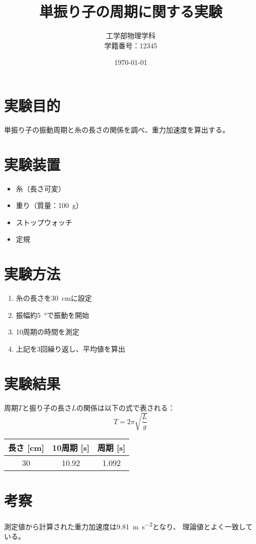 \documentclass[a4paper,11pt]{article}
\title{単振り子の周期に関する実験}
\author{工学部物理学科 \\ 学籍番号：12345}
\date{\today}
\begin{document}
\maketitle

\section{実験目的}
単振り子の振動周期と糸の長さの関係を調べ、重力加速度を算出する。

\section{実験装置}
\begin{itemize}
    \item 糸（長さ可変）
    \item 重り（質量：\SI{100}{\gram}）
    \item ストップウォッチ
    \item 定規
\end{itemize}

\section{実験方法}
\begin{enumerate}
    \item 糸の長さを\SI{30}{\centi\metre}に設定
    \item 振幅約\SI{5}{\degree}で振動を開始
    \item 10周期の時間を測定
    \item 上記を3回繰り返し、平均値を算出
\end{enumerate}

\section{実験結果}
周期$T$と振り子の長さ$L$の関係は以下の式で表される：
\[T = 2\pi\sqrt{\frac{L}{g}}\]

\begin{table}[H]
\centering
\begin{tabular}{|c|c|c|}
\hline
長さ [\si{\centi\metre}] & 10周期 [\si{\second}] & 周期 [\si{\second}] \\
\hline
30 & 10.92 & 1.092 \\
\hline
\end{tabular}
\end{table}

\section{考察}
測定値から計算された重力加速度は\SI{9.81}{\metre\per\second\squared}となり、
理論値とよく一致している。
\end{document}
